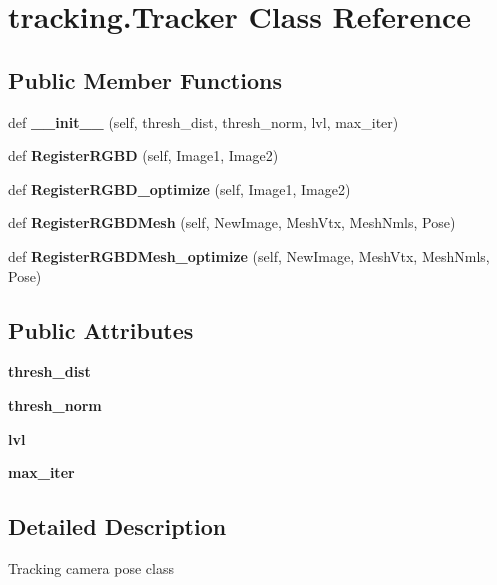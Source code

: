\section{tracking.\+Tracker Class Reference}
\label{classtracking_1_1_tracker}
\subsection*{Public Member Functions}
\begin{DoxyCompactItemize}
\item 
def \textbf{ \+\_\+\+\_\+init\+\_\+\+\_\+} (self, thresh\+\_\+dist, thresh\+\_\+norm, lvl, max\+\_\+iter)
\item 
def \textbf{ Register\+R\+G\+BD} (self, Image1, Image2)
\item 
def \textbf{ Register\+R\+G\+B\+D\+\_\+optimize} (self, Image1, Image2)
\item 
def \textbf{ Register\+R\+G\+B\+D\+Mesh} (self, New\+Image, Mesh\+Vtx, Mesh\+Nmls, Pose)
\item 
def \textbf{ Register\+R\+G\+B\+D\+Mesh\+\_\+optimize} (self, New\+Image, Mesh\+Vtx, Mesh\+Nmls, Pose)
\end{DoxyCompactItemize}
\subsection*{Public Attributes}
\begin{DoxyCompactItemize}
\item 
\mbox{\label{classtracking_1_1_tracker_a1f46d5b2dae7afdaa90a82c9c9105f44}} 
{\bfseries thresh\+\_\+dist}
\item 
\mbox{\label{classtracking_1_1_tracker_acfd351ce92170c6fe1f5627412ca3a6b}} 
{\bfseries thresh\+\_\+norm}
\item 
\mbox{\label{classtracking_1_1_tracker_a08950fc3a5d4f62953bb2c5ee5f8cb16}} 
{\bfseries lvl}
\item 
\mbox{\label{classtracking_1_1_tracker_afa1bc9948ab57bffca4ea0fb99a324de}} 
{\bfseries max\+\_\+iter}
\end{DoxyCompactItemize}


\subsection{Detailed Description}
\begin{DoxyVerb}Tracking camera pose class
\end{DoxyVerb}
 

